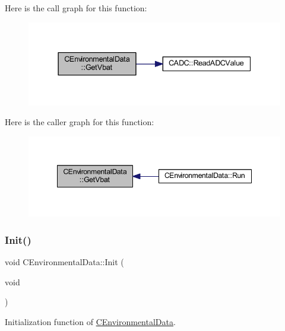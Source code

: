 Here is the call graph for this function\+:\nopagebreak
\begin{figure}[H]
\begin{center}
\leavevmode
\includegraphics[width=337pt]{class_c_environmental_data_a12a6d60a2a0aa406beb82375fa60e875_cgraph}
\end{center}
\end{figure}
Here is the caller graph for this function\+:\nopagebreak
\begin{figure}[H]
\begin{center}
\leavevmode
\includegraphics[width=348pt]{class_c_environmental_data_a12a6d60a2a0aa406beb82375fa60e875_icgraph}
\end{center}
\end{figure}
\mbox{\label{class_c_environmental_data_a3321cce122ef1e1f7e995ee51353e87d}} 
\subsubsection{\texorpdfstring{Init()}{Init()}}
{\footnotesize\ttfamily void C\+Environmental\+Data\+::\+Init (\begin{DoxyParamCaption}\item[{void}]{ }\end{DoxyParamCaption})\hspace{0.3cm}{\ttfamily [virtual]}}



Initialization function of \mbox{\hyperlink{class_c_environmental_data}{C\+Environmental\+Data}}. 



